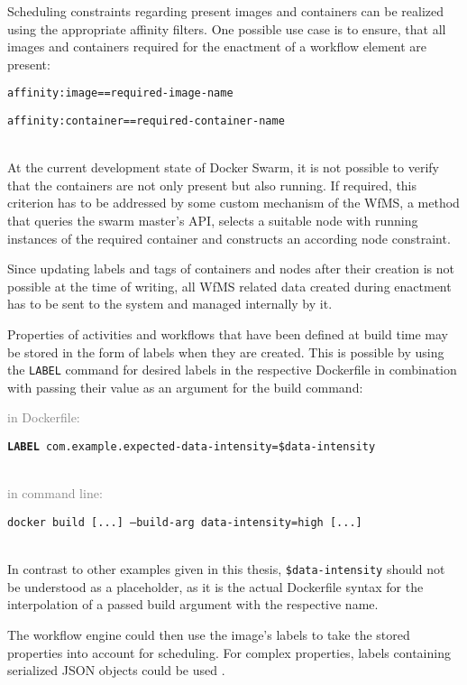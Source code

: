     Scheduling constraints regarding present images and containers can be realized using the appropriate affinity filters. One possible use case is to ensure, that all images and containers required for the enactment of a workflow element are present:
    \\ [0.5ex]
    \centerline{\texttt{affinity:image==required-image-name}}
    \centerline{\texttt{affinity:container==required-container-name}}
    \\ [0.5ex]
    At the current development state of Docker Swarm, it is not possible to verify that the containers are not only present but also running. If required, this criterion has to be addressed by some custom mechanism of the \ac{WfMS}, \eg a method that queries the swarm master's \ac{API}, selects a suitable node with running instances of the required container and constructs an according node constraint.

    Since updating labels and tags of containers and nodes after their creation is not possible at the time of writing, all \ac{WfMS} related data created during enactment has to be sent to the system and managed internally by it.

    Properties of activities and workflows that have been defined at build time may be stored in the form of labels when they are created. This is possible by using the \texttt{LABEL} command for desired labels in the respective Dockerfile in combination with passing their value as an argument for the build command:

    \textcolor{gray}{in Dockerfile:}
    \\ [0.5ex]
    \centerline{\texttt{\textbf{LABEL} com.example.expected-data-intensity=\$data-intensity}}
    \\ [0.5ex]
    \textcolor{gray}{in command line:}
    \\ [0.5ex]
    \centerline{\texttt{docker build [...] --build-arg data-intensity=high [...]}}
    \\ [0.5ex]
    In contrast to other examples given in this thesis, \texttt{\$data-intensity} should not be understood as a placeholder, as it is the actual Dockerfile syntax for the interpolation of a passed build argument with the respective name.

    The workflow engine could then use the image's labels to take the stored properties into account for scheduling. For complex properties, labels containing serialized JSON objects could be used \cite{Docker????Docker}.

